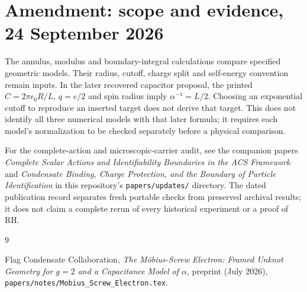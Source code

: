 \documentclass[11pt,a4paper]{article}
\begin{document}
\section*{Amendment: scope and evidence, 24 September 2026}
The annulus, modulus and boundary-integral calculations compare specified geometric models. Their radius, cutoff, charge split and self-energy convention remain inputs. In the later recovered capacitor proposal, the printed $C=2\pi\epsilon_0R/L$, $q=e/2$ and spin radius imply $\alpha^{-1}=L/2$. Choosing an exponential cutoff to reproduce an inserted target does not derive that target. This does not identify all three numerical models with that later formula; it requires each model's normalization to be checked separately before a physical comparison.

For the complete-action and microscopic-carrier audit, see the companion
papers \emph{Complete Scalar Actions and Identifiability Boundaries in the ACS
Framework} and \emph{Condensate Binding, Charge Protection, and the Boundary
of Particle Identification} in this repository's \texttt{papers/updates/}
directory. The dated publication record separates fresh portable checks
from preserved archival results; it does not claim a complete rerun of every
historical experiment or a proof of RH.

\begin{thebibliography}{9}

Flag Condensate Collaboration,
\textit{The M\"obius-Screw Electron: Framed Unknot Geometry for $g=2$
and a Capacitance Model of $\alpha$},
preprint (July 2026),
\nolinkurl{papers/notes/Mobius_Screw_Electron.tex}.

\end{thebibliography}
\end{document}
